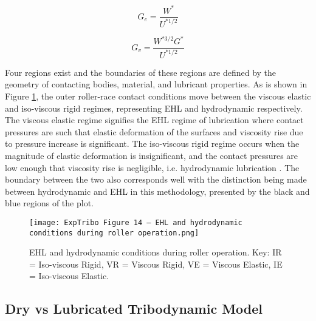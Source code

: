 \begin{equation}\label{GoharGe}
	G_e=\frac{W^*}{U^{* 1 / 2}}
\end{equation}

\begin{equation}\label{GoharGv}
	G_v=\frac{W^{* 3 / 2} G^*}{U^{* 1 / 2}}
\end{equation}

Four regions exist and the boundaries of these regions are defined by the geometry of contacting bodies, material, and lubricant properties. As is shown in Figure \ref{EHL and hydrodynamic conditions during roller operation}, the outer roller-race contact conditions move between the viscous elastic and iso-viscous rigid regimes, representing EHL and hydrodynamic respectively. The viscous elastic regime signifies the EHL regime of lubrication where contact pressures are such that elastic deformation of the surfaces and viscosity rise due to pressure increase is significant. The iso-viscous rigid regime occurs when the magnitude of elastic deformation is insignificant, and the contact pressures are low enough that viscosity rise is negligible, i.e. hydrodynamic lubrication \cite{Hamrock1980}. The boundary between the two also corresponds well with the distinction being made between hydrodynamic and EHL in this methodology, presented by the black and blue regions of the plot.

\begin{figure}
	\centering
	\texttt{[image: ExpTribo Figure 14 – EHL and hydrodynamic conditions during roller operation.png]}
	\caption{EHL and hydrodynamic conditions during roller operation. Key: IR = Iso-viscous Rigid, VR = Viscous Rigid, VE = Viscous Elastic, IE = Iso-viscous Elastic.}
	\label{EHL and hydrodynamic conditions during roller operation}
\end{figure} 

\subsection{Dry vs Lubricated Tribodynamic Model}

